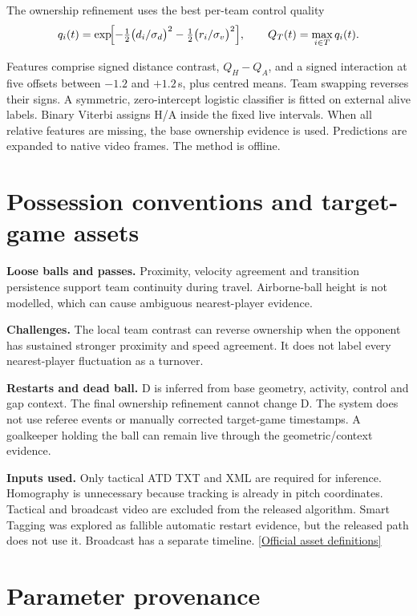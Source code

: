 \documentclass[10pt,a4paper]{article}
\begin{document}
The ownership refinement uses the best per-team control quality
\[
  q_i(t)=\exp\!\Bigl[-\tfrac12\bigl(d_i/\sigma_d\bigr)^2-\tfrac12\bigl(r_i/\sigma_v\bigr)^2\Bigr],
  \qquad Q_T(t)=\max_{i\in T}q_i(t).
\]

Features comprise signed distance contrast, $Q_H-Q_A$, and a signed interaction at five offsets between
$-1.2$ and $+1.2$\,s, plus centred means. Team swapping reverses their signs. A symmetric,
zero-intercept logistic classifier is fitted on external alive labels. Binary Viterbi assigns H/A inside
the fixed live intervals. When all relative features are missing, the base ownership evidence is used.
Predictions are expanded to native video frames. The method is offline.

\section{Possession conventions and target-game assets}

\textbf{Loose balls and passes.} Proximity, velocity agreement and transition persistence support team
continuity during travel. Airborne-ball height is not modelled, which can cause ambiguous nearest-player
evidence.

\textbf{Challenges.} The local team contrast can reverse ownership when the opponent has sustained
stronger proximity and speed agreement. It does not label every nearest-player fluctuation as a turnover.

\textbf{Restarts and dead ball.} D is inferred from base geometry, activity, control and gap context. The
final ownership refinement cannot change D. The system does not use referee events or manually corrected
target-game timestamps. A goalkeeper holding the ball can remain live through the geometric/context
evidence.

\textbf{Inputs used.} Only tactical ATD TXT and XML are required for inference. Homography is unnecessary
because tracking is already in pitch coordinates. Tactical and broadcast video are excluded from the
released algorithm. Smart Tagging was explored as fallible automatic restart evidence, but the released
path does not use it. Broadcast has a separate timeline.
\href{https://github.com/metrica-sports/more-than-a-hack-2027/blob/main/DATA.md}{[Official asset definitions]}

\section{Parameter provenance}
\end{document}
